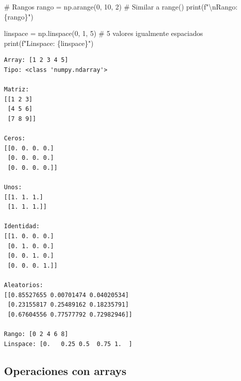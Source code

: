 \documentclass[
  doc,
  floatsintext,
  longtable,
  a4paper,
  nolmodern,
  notxfonts,
  notimes,
  12pt,
  colorlinks=true,linkcolor=blue,citecolor=blue,urlcolor=blue]{apa7}
\newenvironment{Shaded}{\begin{snugshade}}{\end{snugshade}}
\newcommand{\BuiltInTok}[1]{\textcolor[rgb]{0.00,0.23,0.31}{#1}}
\newcommand{\CharTok}[1]{\textcolor[rgb]{0.13,0.47,0.30}{#1}}
\newcommand{\CommentTok}[1]{\textcolor[rgb]{0.37,0.37,0.37}{#1}}
\newcommand{\DecValTok}[1]{\textcolor[rgb]{0.68,0.00,0.00}{#1}}
\newcommand{\NormalTok}[1]{\textcolor[rgb]{0.00,0.23,0.31}{#1}}
\newcommand{\OperatorTok}[1]{\textcolor[rgb]{0.37,0.37,0.37}{#1}}
\newcommand{\SpecialCharTok}[1]{\textcolor[rgb]{0.37,0.37,0.37}{#1}}
\newcommand{\SpecialStringTok}[1]{\textcolor[rgb]{0.13,0.47,0.30}{#1}}
\begin{document}
\begin{Shaded}
\begin{Highlighting}[]
\CommentTok{\# Rangos}
\NormalTok{rango }\OperatorTok{=}\NormalTok{ np.arange(}\DecValTok{0}\NormalTok{, }\DecValTok{10}\NormalTok{, }\DecValTok{2}\NormalTok{)  }\CommentTok{\# Similar a range()}
\BuiltInTok{print}\NormalTok{(}\SpecialStringTok{f"}\CharTok{\textbackslash{}n}\SpecialStringTok{Rango: }\SpecialCharTok{\{}\NormalTok{rango}\SpecialCharTok{\}}\SpecialStringTok{"}\NormalTok{)}

\NormalTok{linspace }\OperatorTok{=}\NormalTok{ np.linspace(}\DecValTok{0}\NormalTok{, }\DecValTok{1}\NormalTok{, }\DecValTok{5}\NormalTok{)  }\CommentTok{\# 5 valores igualmente espaciados}
\BuiltInTok{print}\NormalTok{(}\SpecialStringTok{f"Linspace: }\SpecialCharTok{\{}\NormalTok{linspace}\SpecialCharTok{\}}\SpecialStringTok{"}\NormalTok{)}
\end{Highlighting}
\end{Shaded}

\begin{verbatim}
Array: [1 2 3 4 5]
Tipo: <class 'numpy.ndarray'>

Matriz:
[[1 2 3]
 [4 5 6]
 [7 8 9]]

Ceros:
[[0. 0. 0. 0.]
 [0. 0. 0. 0.]
 [0. 0. 0. 0.]]

Unos:
[[1. 1. 1.]
 [1. 1. 1.]]

Identidad:
[[1. 0. 0. 0.]
 [0. 1. 0. 0.]
 [0. 0. 1. 0.]
 [0. 0. 0. 1.]]

Aleatorios:
[[0.85527655 0.00701474 0.04020534]
 [0.23155817 0.25489162 0.18235791]
 [0.67604556 0.77577792 0.72982946]]

Rango: [0 2 4 6 8]
Linspace: [0.   0.25 0.5  0.75 1.  ]
\end{verbatim}

\subsection{Operaciones con arrays}\label{operaciones-con-arrays}
\end{document}
